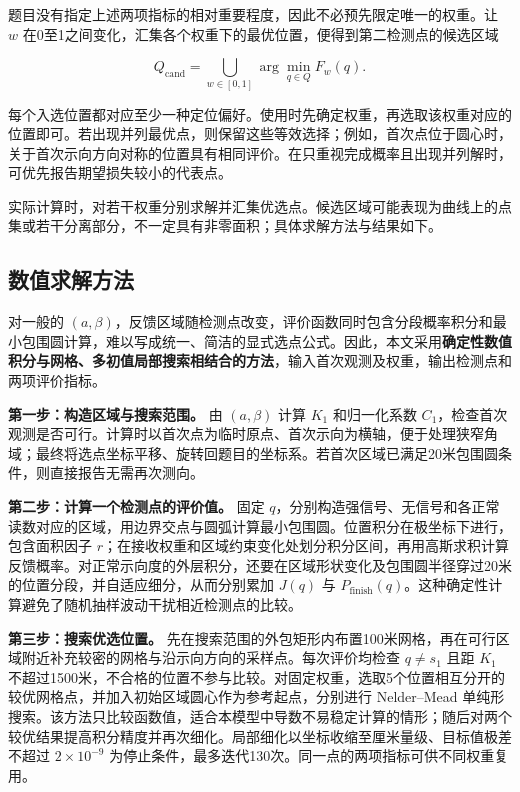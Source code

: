 \documentclass[UTF8,a4paper,zihao=-4,fontset=none]{ctexart}
\begin{document}
题目没有指定上述两项指标的相对重要程度，因此不必预先限定唯一的权重。让 \(w\) 在0至1之间变化，汇集各个权重下的最优位置，便得到第二检测点的候选区域

\begin{equation}
 Q_{\mathrm{cand}}=\bigcup_{w\in[0,1]}\arg\min_{q\in Q}F_w(q).
\label{eq:q2-candidate-region}
\end{equation}

每个入选位置都对应至少一种定位偏好。使用时先确定权重，再选取该权重对应的位置即可。若出现并列最优点，则保留这些等效选择；例如，首次点位于圆心时，关于首次示向方向对称的位置具有相同评价。在只重视完成概率且出现并列解时，可优先报告期望损失较小的代表点。

实际计算时，对若干权重分别求解并汇集优选点。候选区域可能表现为曲线上的点集或若干分离部分，不一定具有非零面积；具体求解方法与结果如下。

\subsection{数值求解方法}

对一般的 \((a,\beta)\)，反馈区域随检测点改变，评价函数同时包含分段概率积分和最小包围圆计算，难以写成统一、简洁的显式选点公式。因此，本文采用\textbf{确定性数值积分与网格、多初值局部搜索相结合的方法}，输入首次观测及权重，输出检测点和两项评价指标。

\textbf{第一步：构造区域与搜索范围。} 由 \((a,\beta)\) 计算 \(K_1\) 和归一化系数 \(C_1\)，检查首次观测是否可行。计算时以首次点为临时原点、首次示向为横轴，便于处理狭窄角域；最终将选点坐标平移、旋转回题目的坐标系。若首次区域已满足20米包围圆条件，则直接报告无需再次测向。

\textbf{第二步：计算一个检测点的评价值。} 固定 \(q\)，分别构造强信号、无信号和各正常读数对应的区域，用边界交点与圆弧计算最小包围圆。位置积分在极坐标下进行，包含面积因子 \(r\)；在接收权重和区域约束变化处划分积分区间，再用高斯求积计算反馈概率。对正常示向度的外层积分，还要在区域形状变化及包围圆半径穿过20米的位置分段，并自适应细分，从而分别累加 \(J(q)\) 与 \(P_{\mathrm{finish}}(q)\)。这种确定性计算避免了随机抽样波动干扰相近检测点的比较。

\textbf{第三步：搜索优选位置。} 先在搜索范围的外包矩形内布置100米网格，再在可行区域附近补充较密的网格与沿示向方向的采样点。每次评价均检查 \(q\ne s_1\) 且距 \(K_1\) 不超过1500米，不合格的位置不参与比较。对固定权重，选取5个位置相互分开的较优网格点，并加入初始区域圆心作为参考起点，分别进行 Nelder--Mead 单纯形搜索。该方法只比较函数值，适合本模型中导数不易稳定计算的情形；随后对两个较优结果提高积分精度并再次细化。局部细化以坐标收缩至厘米量级、目标值极差不超过 \(2\times10^{-9}\) 为停止条件，最多迭代130次。同一点的两项指标可供不同权重复用。
\end{document}
